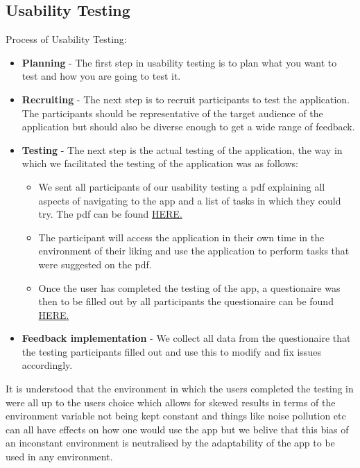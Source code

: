 \documentclass[12pt]{article}
\begin{document}
\subsection{Usability Testing}
Process of Usability Testing:
\begin{itemize}
    \item \textbf{Planning} - The first step in usability testing is to plan what you want to test and how you are going to test it.
    \item \textbf{Recruiting} - The next step is to recruit participants to test the application. The participants should be representative of the target audience of the application but should also be diverse enough to get a wide range of feedback.
    \item \textbf{Testing} - The next step is the actual testing of the application, the way in which we facilitated the testing of the application was as follows:
    \begin{itemize}
        \item We sent all participants of our usability testing a pdf explaining all aspects of navigating to the app and a list of tasks in which they could try. The pdf can be found \href{https://github.com/COS301-SE-2023/Domain-Pulse-A-Sentiment-Analysis-Platform/blob/docs/Demo4Documentation/documentation/Testing%20Policy/Testing_Assistance_Domain_Pulse.pdf}{HERE.}
        \item The participant will access the application in their own time in the environment of their liking and use the application to perform tasks that were suggested on the pdf.
        \item Once the user has completed the testing of the app, a questionaire was then to be filled out by all participants the questionaire can be found \href{https://forms.gle/P6EC4iyg7ZD93LNfA}{HERE.}
    \end{itemize}
    \item \textbf{Feedback implementation} - We collect all data from the questionaire that the testing participants filled out and use this to modify and fix issues accordingly.
\end{itemize}
It is understood that the environment in which the users completed the testing in were all up to the users choice which allows for skewed results in terms of the environment variable not being kept constant and things like noise pollution etc can all have effects on how one would use the app but we belive that this bias of an inconstant environment is neutralised by the adaptability of the app to be used in any environment.
\end{document}
